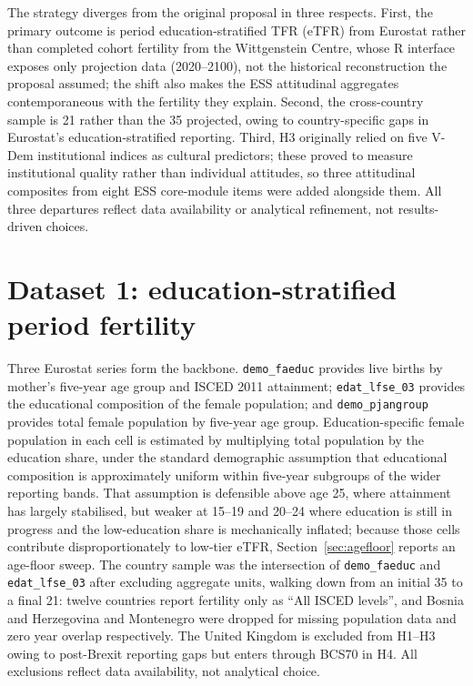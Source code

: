 \documentclass[12pt,a4paper]{report}
\begin{document}
The strategy diverges from the original proposal in three respects. First, the primary outcome is
period education-stratified TFR (eTFR) from Eurostat rather than completed cohort fertility from the
Wittgenstein Centre, whose R interface exposes only projection data (2020--2100), not the historical
reconstruction the proposal assumed; the shift also makes the ESS attitudinal aggregates
contemporaneous with the fertility they explain. Second, the cross-country
sample is 21 rather than the 35 projected, owing to country-specific gaps in Eurostat's
education-stratified reporting. Third, H3 originally relied on five V-Dem institutional indices as
cultural predictors; these proved to measure institutional quality rather than
individual attitudes, so three attitudinal composites from eight ESS core-module items
were added alongside them. All three departures
reflect data availability or analytical refinement, not results-driven choices.

\section{Dataset 1: education-stratified period fertility}
\label{sec:etfr}
Three Eurostat series form the backbone. \texttt{demo\_faeduc} provides live births by mother's
five-year age group and ISCED 2011 attainment; \texttt{edat\_lfse\_03} provides the educational
composition of the female population; and \texttt{demo\_pjangroup} provides total female population
by five-year age group. Education-specific female population in each cell is estimated by
multiplying total population by the education share, under the standard demographic assumption
that educational composition is approximately uniform within five-year subgroups of the wider
reporting bands. That assumption is defensible above age 25, where attainment has largely stabilised,
but weaker at 15--19 and 20--24 where education is still in progress and the
low-education share is mechanically inflated; because those cells contribute
disproportionately to low-tier eTFR, Section~\ref{sec:agefloor} reports an age-floor sweep. The country sample
was the intersection of \texttt{demo\_faeduc} and \texttt{edat\_lfse\_03} after excluding aggregate
units, walking down from an initial 35 to a final 21: twelve countries report fertility only as
``All ISCED levels'', and Bosnia and Herzegovina and Montenegro were dropped for missing population
data and zero year overlap respectively. The United Kingdom is excluded from H1--H3 owing to
post-Brexit reporting gaps but enters through BCS70 in H4. All exclusions reflect
data availability, not analytical choice.
\end{document}
